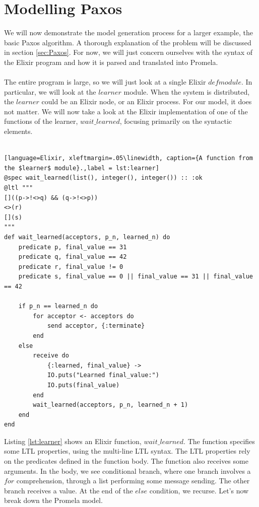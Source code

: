 \section{Modelling Paxos}
We will now demonstrate the model generation process for a larger example, the basic Paxos algorithm. A thorough explanation of the problem will be discussed in section \ref{sec:Paxos}. For now, we will just concern ourselves with the syntax of the Elixir program and how it is parsed and translated into Promela.
\\ \\
The entire program is large, so we will just look at a single Elixir $defmodule$. In particular, we will look at the $learner$ module. When the system is distributed, the $learner$ could be an Elixir node, or an Elixir process. For our model, it does not matter. We will now take a look at the Elixir implementation of one of the functions of the learner, $wait\_learned$, focusing primarily on the syntactic elements.
\\ \\
\begin{lstlisting}[language=Elixir, xleftmargin=.05\linewidth, caption={A function from the $learner$ module}.,label = lst:learner]
@spec wait_learned(list(), integer(), integer()) :: :ok
@ltl """
[]((p->!<>q) && (q->!<>p))
<>(r)
[](s)
"""
def wait_learned(acceptors, p_n, learned_n) do
    predicate p, final_value == 31
    predicate q, final_value == 42
    predicate r, final_value != 0
    predicate s, final_value == 0 || final_value == 31 || final_value == 42

    if p_n == learned_n do
        for acceptor <- acceptors do
            send acceptor, {:terminate}
        end
    else
        receive do
            {:learned, final_value} ->
            IO.puts("Learned final_value:")
            IO.puts(final_value)
        end
        wait_learned(acceptors, p_n, learned_n + 1)
    end
end
\end{lstlisting}
Listing \ref{lst:learner} shows an Elixir function, $wait\_learned$. The function specifies some LTL properties, using the multi-line LTL syntax. The LTL properties rely on the predicates defined in the function body. The function also receives some arguments. In the body, we see conditional branch, where one branch involves a $for$ comprehension, through a list performing some message sending. The other branch receives a value. At the end of the $else$ condition, we recurse. Let's now break down the Promela model.
\\ \\
